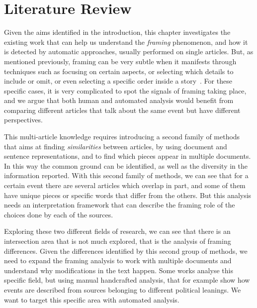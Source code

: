 \chapter{Literature Review}
\label{chap:literature_review}



Given the aims identified in the introduction, this chapter investigates the existing work that can help us understand the \emph{framing} phenomenon, and how it is detected by automatic approaches, usually performed on single articles.
But, as mentioned previously, %
framing can be very subtle when it manifests through techniques such as focusing on certain aspects, or selecting which details to include or omit, or even selecting a specific order inside a story~\cite{morstatter2018identifying}.
For these specific cases, it is very complicated to spot the signals of framing taking place, and we argue that both human and automated analysis would benefit from comparing different articles that talk about the same event but have different perspectives. %

This multi-article knowledge requires introducing a second family of methods that aims at finding \emph{similarities} between articles, by using document and sentence representations, and to find which pieces appear in multiple documents. In this way the common ground can be identified, as well as the diversity in the information reported.
With this second family of methods, we can see that for a certain event there are several articles which overlap in part, and some of them have unique pieces or specific words that differ from the others. But this analysis needs an interpretation framework that can describe the framing role of the choices done by each of the sources.

Exploring these two different fields of research, we can see that there is an intersection area that is not much explored, that is the analysis of framing differences. Given the differences identified by this second group of methods, we need to expand the framing analysis to work with multiple documents and understand why modifications in the text happen.
Some works analyse this specific field, but using manual handcrafted analysis, that for example show how events are described from sources belonging to different political leanings. We want to target this specific area with automated analysis.

